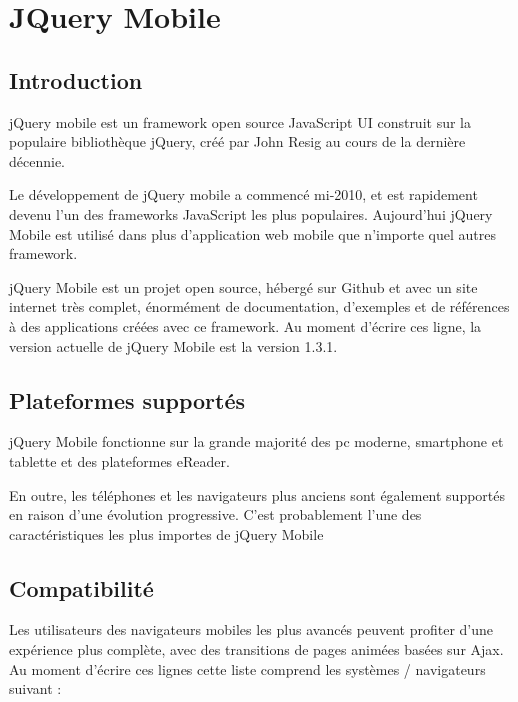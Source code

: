 \section{JQuery Mobile}
\label{ch:jquery mobile}

\subsection{Introduction}

jQuery mobile est un framework open source JavaScript UI construit sur la populaire bibliothèque jQuery, créé par John Resig au cours de la dernière décennie.

Le développement de jQuery mobile a commencé mi-2010, et est rapidement devenu l’un des frameworks JavaScript les plus populaires. Aujourd’hui jQuery Mobile est utilisé dans plus d’application web mobile que n'importe quel autres framework.

jQuery Mobile est un projet open source, hébergé sur Github et avec un site internet très complet, énormément de documentation, d’exemples et de références à des applications créées avec ce framework.
Au moment d’écrire ces ligne, la version actuelle de jQuery Mobile est la version 1.3.1.

\subsection{Plateformes supportés}

jQuery Mobile fonctionne sur la grande majorité des pc moderne, smartphone et tablette et des plateformes eReader.

En outre, les téléphones et les navigateurs plus anciens sont également supportés en raison d’une évolution progressive. C’est probablement l’une des caractéristiques les plus importes de jQuery Mobile

\subsection{Compatibilité}

Les utilisateurs des navigateurs mobiles les plus avancés peuvent profiter d’une expérience plus complète, avec des transitions de pages animées basées sur Ajax. Au moment d’écrire ces lignes cette liste comprend les systèmes / navigateurs suivant :

